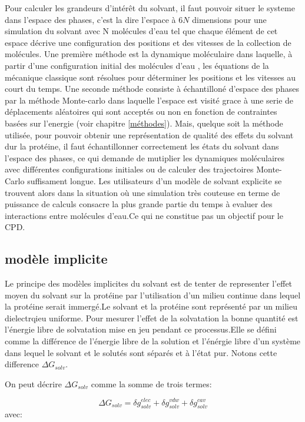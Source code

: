 Pour calculer les grandeurs d'intérêt du solvant, il faut pouvoir situer le systeme dans l'espace des phases, c'est la dire l'espace à $6N$ dimensions pour une simulation du solvant avec N molécules d'eau tel que chaque élément de cet espace décrive une configuration des positions et des vitesses de la collection de molécules.
Une première méthode est la dynamique moléculaire dans laquelle,  à partir d'une configuration initial des molécules d'eau , les équations de la mécanique classique sont résolues pour déterminer les positions et les vitesses au court du temps. Une seconde méthode consiste à échantilloné d'espace des phases par la méthode Monte-carlo dans laquelle l'espace est visité grace à une serie de  déplacements  aléatoires qui sont acceptés ou non en fonction de contraintes basées sur l'energie (voir chapitre \ref{méthodes}).
Mais, quelque soit la méthode utilisée, pour pouvoir obtenir une représentation de qualité des effets du solvant dur la protéine, il faut échantillonner correctement les états du solvant dans l'espace des phases, ce qui demande de mutiplier les dynamiques moléculaires avec différentes configurations initiales ou de calculer des trajectoires Monte-Carlo suffisament longue.
Les utilisateurs d'un modèle de solvant explicite se trouvent alors dans la situation où une simulation très couteuse en terme de puissance de calculs consacre la plus grande partie du temps à evaluer des interactions entre molécules d'eau.Ce qui ne constitue pas un objectif pour le CPD.

\subsection{modèle implicite}

Le principe des modèles implicites du solvant est de tenter de representer l'effet moyen du solvant sur la protéine par l'utilisation d'un milieu continue dans lequel la protéine serait immergé.Le solvant et la protéine sont représenté par un milieu dielectrqieu uniforme.
Pour mesurer l'effet de la solvatation la bonne quantité est l'énergie libre de solvatation mise en jeu pendant ce processus.Elle se défini comme la différence de l'énergie libre de la solution et l'énérgie libre d'un système dans lequel le solvant et le solutés sont séparés et à l'état pur. Notons cette difference $\Delta G_{solv}$.

On peut décrire $\Delta G_{solv}$ comme la somme de trois termes:

\begin{equation}
  \label{eq:enersolv}
  \Delta G_{solv} = \delta g_{solv}^{elec} + \delta g_{solv}^{vdw} + \delta g_{solv}^{cav}
\end{equation}
avec:

